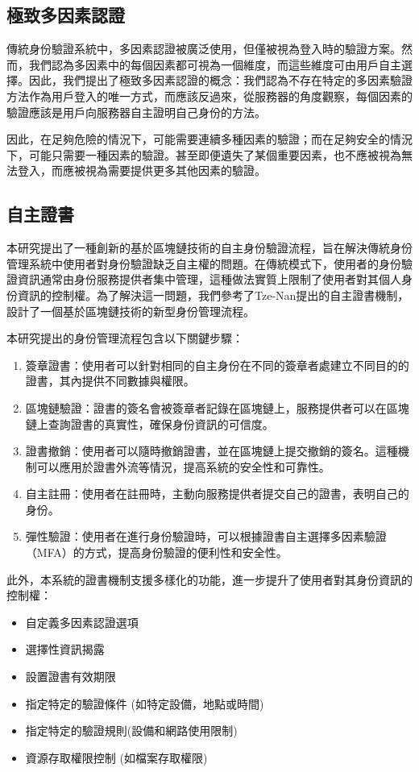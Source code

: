 \subsection{極致多因素認證}
傳統身份驗證系統中，多因素認證被廣泛使用，但僅被視為登入時的驗證方案。然而，我們認為多因素中的每個因素都可視為一個維度，而這些維度可由用戶自主選擇。因此，我們提出了極致多因素認證的概念：我們認為不存在特定的多因素驗證方法作為用戶登入的唯一方式，而應該反過來，從服務器的角度觀察，每個因素的驗證應該是用戶向服務器自主證明自己身份的方法。

因此，在足夠危險的情況下，可能需要連續多種因素的驗證；而在足夠安全的情況下，可能只需要一種因素的驗證。甚至即便遺失了某個重要因素，也不應被視為無法登入，而應被視為需要提供更多其他因素的驗證。
\subsection{自主證書}
本研究提出了一種創新的基於區塊鏈技術的自主身份驗證流程，旨在解決傳統身份管理系統中使用者對身份驗證缺乏自主權的問題。在傳統模式下，使用者的身份驗證資訊通常由身份服務提供者集中管理，這種做法實質上限制了使用者對其個人身份資訊的控制權。為了解決這一問題，我們參考了Tze-Nan\cite{NTU202102846}提出的自主證書機制，設計了一個基於區塊鏈技術的新型身份管理流程。

本研究提出的身份管理流程包含以下關鍵步驟：
\begin{enumerate}
  \item 簽章證書：使用者可以針對相同的自主身份在不同的簽章者處建立不同目的的證書，其內提供不同數據與權限。
  \item 區塊鏈驗證：證書的簽名會被簽章者記錄在區塊鏈上，服務提供者可以在區塊鏈上查詢證書的真實性，確保身份資訊的可信度。
  \item 證書撤銷：使用者可以隨時撤銷證書，並在區塊鏈上提交撤銷的簽名。這種機制可以應用於證書外流等情況，提高系統的安全性和可靠性。
  \item 自主註冊：使用者在註冊時，主動向服務提供者提交自己的證書，表明自己的身份。
  \item 彈性驗證：使用者在進行身份驗證時，可以根據證書自主選擇多因素驗證（MFA）的方式，提高身份驗證的便利性和安全性。
\end{enumerate}
此外，本系統的證書機制支援多樣化的功能，進一步提升了使用者對其身份資訊的控制權：
\begin{itemize}
  \item 自定義多因素認證選項
  \item 選擇性資訊揭露
  \item 設置證書有效期限
  \item 指定特定的驗證條件 (如特定設備，地點或時間)
  \item 指定特定的驗證規則(設備和網路使用限制)
  \item 資源存取權限控制 (如檔案存取權限)
\end{itemize}

